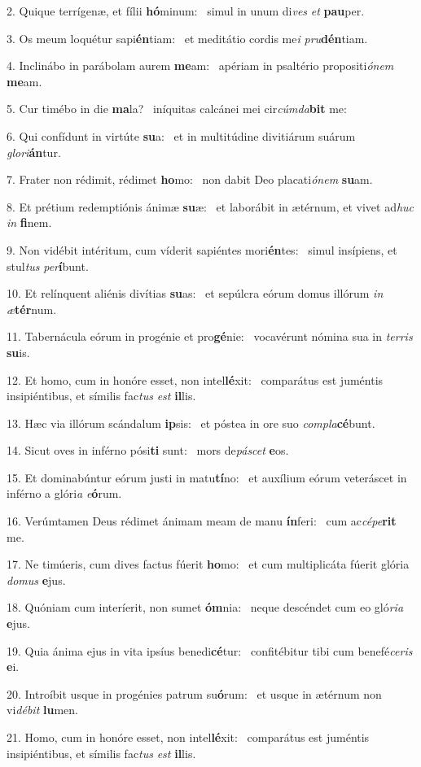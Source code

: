 2. Quique terrígenæ, et fílii \textbf{hó}minum: \ast\  simul in unum di\textit{ves} \textit{et} \textbf{pau}per.\

3. Os meum loquétur sapi\textbf{én}tiam: \ast\  et meditátio cordis me\textit{i} \textit{pru}\textbf{dén}tiam.\

4. Inclinábo in parábolam aurem \textbf{me}am: \ast\  apériam in psaltério propositi\textit{ó}\textit{nem} \textbf{me}am.\

5. Cur timébo in die \textbf{ma}la? \ast\  iníquitas calcánei mei cir\textit{cúm}\textit{da}\textbf{bit} me:\

6. Qui confídunt in virtúte \textbf{su}a: \ast\  et in multitúdine divitiárum suárum \textit{glo}\textit{ri}\textbf{án}tur.\

7. Frater non rédimit, rédimet \textbf{ho}mo: \ast\  non dabit Deo placati\textit{ó}\textit{nem} \textbf{su}am.\

8. Et prétium redemptiónis ánimæ \textbf{su}æ: \ast\  et laborábit in ætérnum, et vivet ad\textit{huc} \textit{in} \textbf{fi}nem.\

9. Non vidébit intéritum, cum víderit sapiéntes mori\textbf{én}tes: \ast\  simul insípiens, et stul\textit{tus} \textit{per}\textbf{í}bunt.\

10. Et relínquent aliénis divítias \textbf{su}as: \ast\  et sepúlcra eórum domus illórum \textit{in} \textit{æ}\textbf{tér}num.\

11. Tabernácula eórum in progénie et pro\textbf{gé}nie: \ast\  vocavérunt nómina sua in \textit{ter}\textit{ris} \textbf{su}is.\

12. Et homo, cum in honóre esset, non intel\textbf{lé}xit: \ast\  comparátus est juméntis insipiéntibus, et símilis fac\textit{tus} \textit{est} \textbf{il}lis.\

13. Hæc via illórum scándalum \textbf{ip}sis: \ast\  et póstea in ore suo \textit{com}\textit{pla}\textbf{cé}bunt.\

14. Sicut oves in inférno pósi\textbf{ti} sunt: \ast\  mors de\textit{pá}\textit{scet} \textbf{e}os.\

15. Et dominabúntur eórum justi in matu\textbf{tí}no: \ast\  et auxílium eórum veteráscet in inférno a glóri\textit{a} \textit{e}\textbf{ó}rum.\

16. Verúmtamen Deus rédimet ánimam meam de manu \textbf{ín}feri: \ast\  cum ac\textit{cé}\textit{pe}\textbf{rit} me.\

17. Ne timúeris, cum dives factus fúerit \textbf{ho}mo: \ast\  et cum multiplicáta fúerit glória \textit{do}\textit{mus} \textbf{e}jus.\

18. Quóniam cum interíerit, non sumet \textbf{óm}nia: \ast\  neque descéndet cum eo gló\textit{ri}\textit{a} \textbf{e}jus.\

19. Quia ánima ejus in vita ipsíus benedi\textbf{cé}tur: \ast\  confitébitur tibi cum benefé\textit{ce}\textit{ris} \textbf{e}i.\

20. Introíbit usque in progénies patrum su\textbf{ó}rum: \ast\  et usque in ætérnum non vi\textit{dé}\textit{bit} \textbf{lu}men.\

21. Homo, cum in honóre esset, non intel\textbf{lé}xit: \ast\  comparátus est juméntis insipiéntibus, et símilis fac\textit{tus} \textit{est} \textbf{il}lis.\


